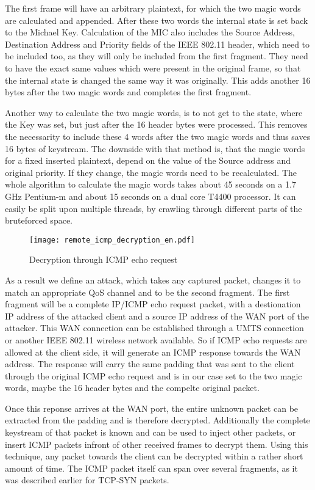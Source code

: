 \documentclass[a4paper,10pt]{scrartcl}
\begin{document}
The first frame will have an arbitrary plaintext, for which the two magic words are calculated and appended. After these two words
the internal state is set back to the Michael Key. Calculation of the MIC also includes the Source Address, Destination Address and
Priority fields of the IEEE 802.11 header, which need to be included too, as they will only be included from the first fragment. They
need to have the exact same values which were present in the original frame, so that the internal state is changed the same way it was
originally. This adds another 16 bytes after the two magic words and completes the first fragment.

Another way to calculate the two magic words, is to not get to the state, where the Key was set, but just after the 16 header bytes were
processed. This removes the necessarity to include these 4 words after the two magic words and thus saves 16 bytes of keystream.
The downside with that method is, that the magic words for a fixed inserted plaintext, depend on the value of the Source address and
original priority. If they change, the magic words need to be recalculated. The whole algorithm to calculate the magic words takes
about 45 seconds on a 1.7 GHz Pentium-m and about 15 seconds on a dual core T4400 processor. It can easily be split upon multiple
threads, by crawling through different parts of the bruteforced space.

\begin{figure}[htbp]
  \centering
    \texttt{[image: remote\_icmp\_decryption\_en.pdf]}
  \caption{Decryption through ICMP echo request}
  \label{figure:remote_icmp_decryption}
\end{figure}

As a result we define an attack, which takes any captured packet, changes it to match an appropriate QoS channel and to be the second
fragment. The first fragment will be a complete IP/ICMP echo request packet, with a destionation IP address of the attacked client and
a source IP address of the WAN port of the attacker. This WAN connection can be established through a UMTS connection or another IEEE
802.11 wireless network available. So if ICMP echo requests are allowed at the client side, it will generate an ICMP response towards
the WAN address. The response will carry the same padding that was sent to the client through the original ICMP echo request and is
in our case set to the two magic words, maybe the 16 header bytes and the compelte original packet.

Once this reponse arrives at the WAN port, the entire unknown packet can be extracted from the padding and is therefore decrypted.
Additionally the complete keystream of that packet is known and can be used to inject other packets, or insert ICMP packets infront of
other received frames to decrypt them. Using this technique, any packet towards the client can be decrypted within a rather short amount
of time. The ICMP packet itself can span over several fragments, as it was described earlier for TCP-SYN packets.
\end{document}
